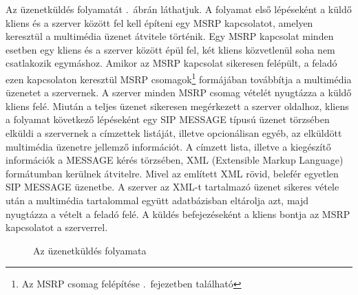Az üzenetküldés folyamatát .~ábrán láthatjuk. A folyamat első lépéseként a küldő kliens és a szerver között fel kell építeni egy MSRP kapcsolatot, amelyen keresztül a multimédia üzenet átvitele történik. Egy MSRP kapcsolat minden esetben egy kliens és a szerver között épül fel, két kliens közvetlenül soha nem csatlakozik egymáshoz. Amikor az MSRP kapcsolat sikeresen felépült, a feladó ezen kapcsolaton keresztül MSRP csomagok\footnote{Az MSRP csomag felépítése .~fejezetben található} formájában továbbítja a multimédia üzenetet a szervernek. A szerver minden MSRP csomag vételét nyugtázza a küldő kliens felé. Miután a teljes üzenet sikeresen megérkezett a szerver oldalhoz, kliens a folyamat következő lépéseként egy SIP MESSAGE típusú üzenet törzsében elküldi a szervernek a címzettek listáját, illetve opcionálisan egyéb, az elküldött multimédia üzenetre jellemző információt. A címzett lista, illetve a kiegészítő információk a MESSAGE kérés törzsében, XML (Extensible Markup Language) formátumban kerülnek átvitelre. Mivel az említett XML rövid, belefér egyetlen SIP MESSAGE üzenetbe. A szerver az XML-t tartalmazó üzenet sikeres vétele után a multimédia tartalommal együtt adatbázisban eltárolja azt, majd nyugtázza a vételt a feladó felé. A küldés befejezéseként a kliens bontja az MSRP kapcsolatot a szerverrel.

\begin{figure}[htbp]
\center
{}
\caption{Az üzenetküldés folyamata}
\label{fig:sending_proc}
\end{figure}

